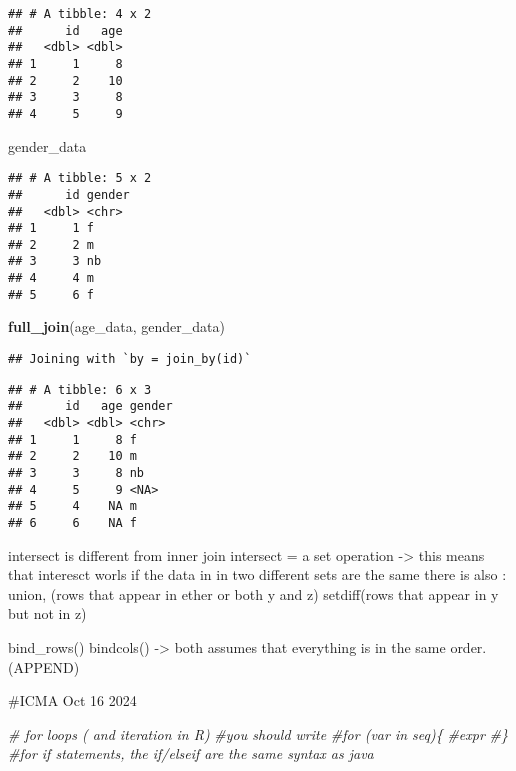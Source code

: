 \documentclass[
]{article}
\newenvironment{Shaded}{\begin{snugshade}}{\end{snugshade}}
\newcommand{\CommentTok}[1]{\textcolor[rgb]{0.56,0.35,0.01}{\textit{#1}}}
\newcommand{\FunctionTok}[1]{\textcolor[rgb]{0.13,0.29,0.53}{\textbf{#1}}}
\newcommand{\NormalTok}[1]{#1}
\begin{document}
\begin{verbatim}
## # A tibble: 4 x 2
##      id   age
##   <dbl> <dbl>
## 1     1     8
## 2     2    10
## 3     3     8
## 4     5     9
\end{verbatim}

\begin{Shaded}
\begin{Highlighting}[]
\NormalTok{gender\_data}
\end{Highlighting}
\end{Shaded}

\begin{verbatim}
## # A tibble: 5 x 2
##      id gender
##   <dbl> <chr> 
## 1     1 f     
## 2     2 m     
## 3     3 nb    
## 4     4 m     
## 5     6 f
\end{verbatim}

\begin{Shaded}
\begin{Highlighting}[]
\FunctionTok{full\_join}\NormalTok{(age\_data, gender\_data)}
\end{Highlighting}
\end{Shaded}

\begin{verbatim}
## Joining with `by = join_by(id)`
\end{verbatim}

\begin{verbatim}
## # A tibble: 6 x 3
##      id   age gender
##   <dbl> <dbl> <chr> 
## 1     1     8 f     
## 2     2    10 m     
## 3     3     8 nb    
## 4     5     9 <NA>  
## 5     4    NA m     
## 6     6    NA f
\end{verbatim}

intersect is different from inner join intersect = a set operation
-\textgreater{} this means that interesct worls if the data in in two
different sets are the same there is also : union, (rows that appear in
ether or both y and z) setdiff(rows that appear in y but not in z)

bind\_rows() bindcols() -\textgreater{} both assumes that everything is
in the same order.(APPEND)

\#ICMA Oct 16 2024

\begin{Shaded}
\begin{Highlighting}[]
\CommentTok{\# for loops ( and iteration in R)}
\CommentTok{\#you should write }
\CommentTok{\#for (var in seq)\{}
  \CommentTok{\#expr}
\CommentTok{\#\}}
\CommentTok{\#for if statements, the if/elseif are the same syntax as java}
\end{Highlighting}
\end{Shaded}
\end{document}
